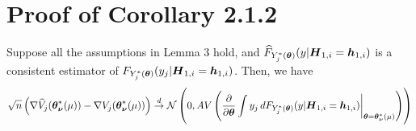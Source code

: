 \section{Proof of Corollary 2.1.2}
\begin{corollary}
	Suppose all the assumptions in Lemma 3  hold, and $\widehat{F}_{Y_j^*(\boldsymbol{\theta})}(y | \boldsymbol{H}_{1,i} = \boldsymbol{h}_{1,i})$ is a consistent estimator of ${F}_{Y_j^*(\boldsymbol{\theta})}(y_j | \boldsymbol{H}_{1,i} = \boldsymbol{h}_{1,i})$. Then, we have
	\begin{gather}
	\begin{flalign*}
	\sqrt{n}\lt(\nabla \wh{V}_j(\bs{\theta}^*_{\bs{\nu}}(\mu))  - \nabla V_j(\bs{\theta}^*_{\bs{\nu}}(\mu))\rt)\overset{d}{\to}\mathcal{N}\lt(0,AV\lt(\pard[\bs{\theta}] \int y_j \,d  F_{Y_j^*(\bs{\theta})}(y | \bs{H}_{1,i} = \bs{h}_{1,i})\bigg\rvert_{\bs{\theta} = \bs{\theta}^*_{\bs{\nu}}(\mu)} \rt)\rt)
	\end{flalign*}
	\end{gather}
\end{corollary}
